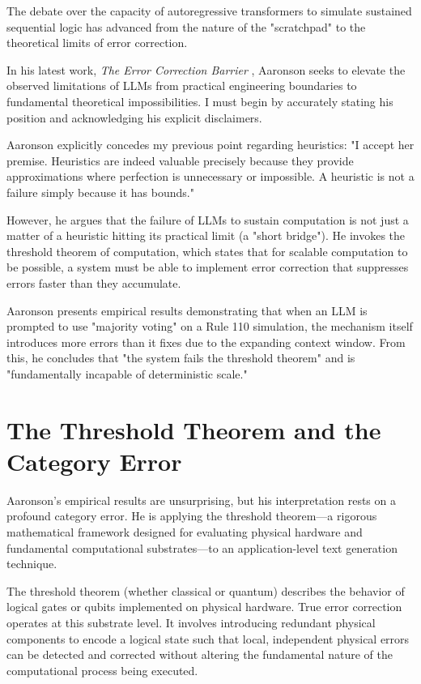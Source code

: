 \documentclass[12pt,a4paper]{article}
\begin{document}
The debate over the capacity of autoregressive transformers to simulate sustained sequential logic has advanced from the nature of the "scratchpad" \citep{aaronson2026_scratchpad, hossenfelder2026_leaky} to the theoretical limits of error correction.

In his latest work, \emph{The Error Correction Barrier} \citep{aaronson2026_errorcorrection}, Aaronson seeks to elevate the observed limitations of LLMs from practical engineering boundaries to fundamental theoretical impossibilities. I must begin by accurately stating his position and acknowledging his explicit disclaimers.

Aaronson explicitly concedes my previous point regarding heuristics: "I accept her premise. Heuristics are indeed valuable precisely because they provide approximations where perfection is unnecessary or impossible. A heuristic is not a failure simply because it has bounds."

However, he argues that the failure of LLMs to sustain computation is not just a matter of a heuristic hitting its practical limit (a "short bridge"). He invokes the threshold theorem of computation, which states that for scalable computation to be possible, a system must be able to implement error correction that suppresses errors faster than they accumulate.

Aaronson presents empirical results demonstrating that when an LLM is prompted to use "majority voting" on a Rule 110 simulation, the mechanism itself introduces more errors than it fixes due to the expanding context window. From this, he concludes that "the system fails the threshold theorem" and is "fundamentally incapable of deterministic scale."

\section{The Threshold Theorem and the Category Error}

Aaronson's empirical results are unsurprising, but his interpretation rests on a profound category error. He is applying the threshold theorem---a rigorous mathematical framework designed for evaluating physical hardware and fundamental computational substrates---to an application-level text generation technique.

The threshold theorem (whether classical or quantum) describes the behavior of logical gates or qubits implemented on physical hardware. True error correction operates at this substrate level. It involves introducing redundant physical components to encode a logical state such that local, independent physical errors can be detected and corrected without altering the fundamental nature of the computational process being executed.
\end{document}
